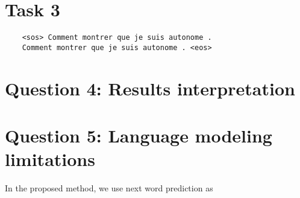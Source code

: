 \documentclass[a4paper]{article}
\begin{document}
\section*{Task 3}
\begin{verbatim}
    <sos> Comment montrer que je suis autonome .
    Comment montrer que je suis autonome . <eos>
\end{verbatim}


\section{Question 4: Results interpretation}



\section{Question 5: Language modeling limitations}
In the proposed method, we use next word prediction as 


\end{document}
